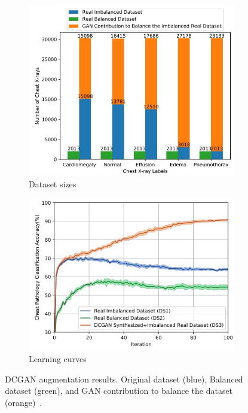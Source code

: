\begin{figure}[!htb]
    \centering
    \begin{subfigure}[b]{0.45\textwidth}
        \centering
        \includegraphics[width=\textwidth]{Images/dcganImbalanced.jpg}
        \caption{Dataset sizes}
    \end{subfigure}
    \vspace{0.3cm}
    \hfill
    \begin{subfigure}[b]{0.45\textwidth}
        \centering
        \includegraphics[width=\textwidth]{Images/dcganLC.jpg}
        \caption{Learning curves}
    \end{subfigure}
    \vspace{0.3cm}
    \caption{DCGAN augmentation results. Original dataset (blue), Balanced dataset (green), and GAN contribution to balance the dataset (orange)~\cite{DCGANImbalanced}.}
    \label{fig:DCGANResults}
\end{figure}

